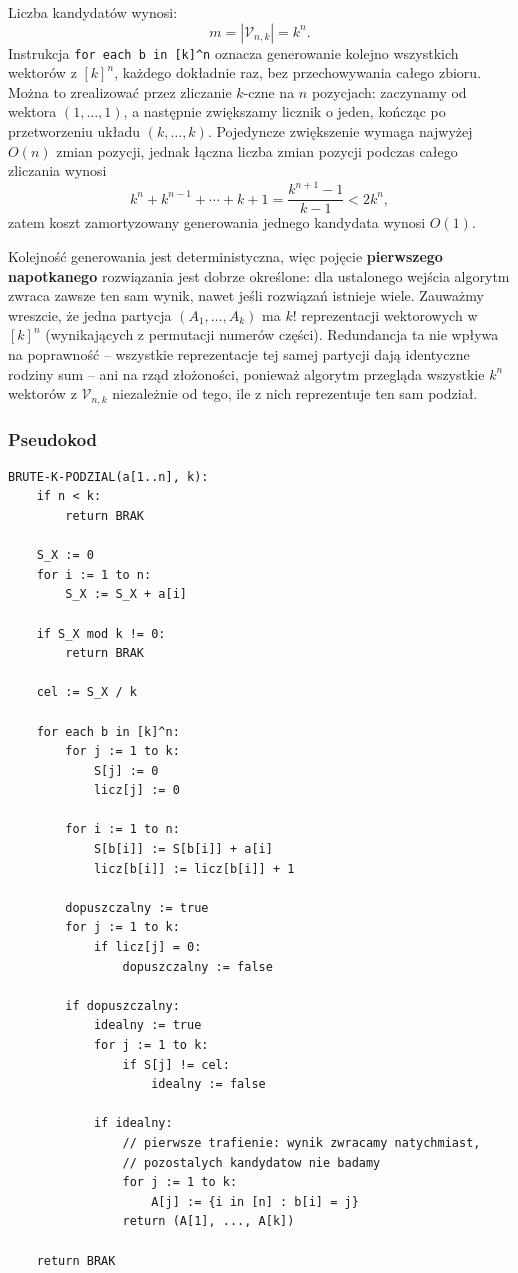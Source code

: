 \documentclass[11pt]{article}
\begin{document}
Liczba kandydatów wynosi:
\begin{equation}
m=|\mathcal{V}_{n,k}|=k^n.
\end{equation}
Instrukcja \texttt{for each b in [k]\^{}n} oznacza generowanie kolejno wszystkich wektorów z \([k]^n\), każdego dokładnie raz, bez przechowywania całego zbioru. Można to zrealizować przez zliczanie \(k\)-czne na \(n\) pozycjach: zaczynamy od wektora \((1,\ldots,1)\), a następnie zwiększamy licznik o jeden, kończąc po przetworzeniu układu \((k,\ldots,k)\). Pojedyncze zwiększenie wymaga najwyżej \(O(n)\) zmian pozycji, jednak łączna liczba zmian pozycji podczas całego zliczania wynosi
\begin{equation}
k^n+k^{n-1}+\cdots+k+1=\frac{k^{n+1}-1}{k-1}<2k^n,
\end{equation}
zatem koszt zamortyzowany generowania jednego kandydata wynosi \(O(1)\).

Kolejność generowania jest deterministyczna, więc pojęcie \textbf{pierwszego napotkanego} rozwiązania jest dobrze określone: dla ustalonego wejścia algorytm zwraca zawsze ten sam wynik, nawet jeśli rozwiązań istnieje wiele. Zauważmy wreszcie, że jedna partycja \((A_1,\ldots,A_k)\) ma \(k!\) reprezentacji wektorowych w \([k]^n\) (wynikających z permutacji numerów części). Redundancja ta nie wpływa na poprawność -- wszystkie reprezentacje tej samej partycji dają identyczne rodziny sum -- ani na rząd złożoności, ponieważ algorytm przegląda wszystkie \(k^n\) wektorów z \(\mathcal{V}_{n,k}\) niezależnie od tego, ile z nich reprezentuje ten sam podział.

\subsubsection{Pseudokod}

\begin{verbatim}
BRUTE-K-PODZIAL(a[1..n], k):
    if n < k:
        return BRAK

    S_X := 0
    for i := 1 to n:
        S_X := S_X + a[i]

    if S_X mod k != 0:
        return BRAK

    cel := S_X / k

    for each b in [k]^n:
        for j := 1 to k:
            S[j] := 0
            licz[j] := 0

        for i := 1 to n:
            S[b[i]] := S[b[i]] + a[i]
            licz[b[i]] := licz[b[i]] + 1

        dopuszczalny := true
        for j := 1 to k:
            if licz[j] = 0:
                dopuszczalny := false

        if dopuszczalny:
            idealny := true
            for j := 1 to k:
                if S[j] != cel:
                    idealny := false

            if idealny:
                // pierwsze trafienie: wynik zwracamy natychmiast,
                // pozostalych kandydatow nie badamy
                for j := 1 to k:
                    A[j] := {i in [n] : b[i] = j}
                return (A[1], ..., A[k])

    return BRAK
\end{verbatim}
\end{document}
